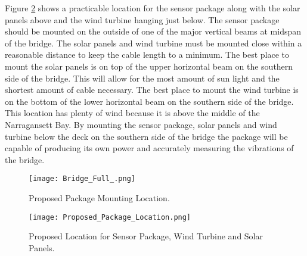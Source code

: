 Figure \ref{fig:Proposed Package, Panels and Turbine Location} shows a practicable location for the sensor package along with the solar panels above and
the wind turbine hanging just below. The sensor package should be mounted on the outside of one of the major vertical beams at midspan of the bridge. The
solar panels and wind turbine must be mounted close within a reasonable distance to keep the cable length to a minimum. The best place to mount the
solar panels is on top of the upper horizontal beam on the southern side of the bridge. This will allow for the most amount of sun light and the
shortest amount of cable necessary. The best place to mount the wind turbine is on the bottom of the lower horizontal beam on the southern side of the
bridge. This location has plenty of wind because it is above the middle of the Narragansett Bay. By mounting the sensor package, solar panels and
wind turbine below the deck on the southern side of the bridge the package will be capable of producing its own power and accurately measuring the
vibrations of the bridge.


\begin{figure}[ht]
\centering
\texttt{[image: Bridge\_Full\_.png]}
\caption{Proposed Package Mounting Location.}
\label{fig:PackageLocation}
\end{figure}


\begin{figure}[ht]
\centering
\texttt{[image: Proposed\_Package\_Location.png]}
\caption{Proposed Location for Sensor Package, Wind Turbine and Solar Panels.}
\label{fig:Proposed Package, Panels and Turbine Location}
\end{figure}
